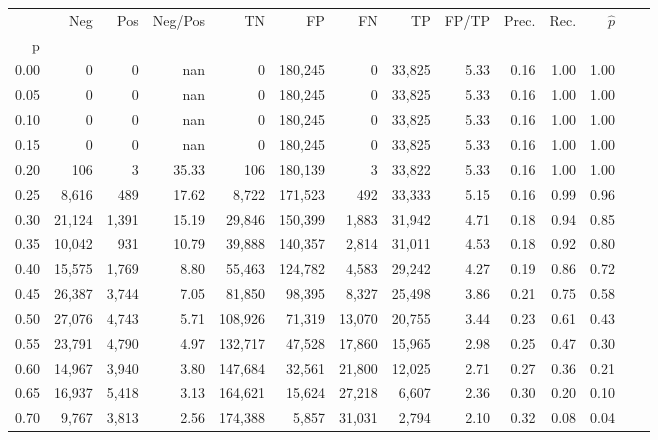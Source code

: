\begin{tabular}{rrrrrrrrrrrrrr}
\toprule
{} &     Neg &    Pos & Neg/Pos &       TN &       FP &      FN &      TP & FP/TP & Prec. &  Rec. & $\hat{p}$ \\
p    &         &        &         &          &          &         &         &       &       &       &           \\
\midrule
0.00 &       0 &      0 &     nan &        0 &  180,245 &       0 &  33,825 &  5.33 &  0.16 &  1.00 &      1.00 \\
0.05 &       0 &      0 &     nan &        0 &  180,245 &       0 &  33,825 &  5.33 &  0.16 &  1.00 &      1.00 \\
0.10 &       0 &      0 &     nan &        0 &  180,245 &       0 &  33,825 &  5.33 &  0.16 &  1.00 &      1.00 \\
0.15 &       0 &      0 &     nan &        0 &  180,245 &       0 &  33,825 &  5.33 &  0.16 &  1.00 &      1.00 \\
0.20 &     106 &      3 &   35.33 &      106 &  180,139 &       3 &  33,822 &  5.33 &  0.16 &  1.00 &      1.00 \\
0.25 &   8,616 &    489 &   17.62 &    8,722 &  171,523 &     492 &  33,333 &  5.15 &  0.16 &  0.99 &      0.96 \\
0.30 &  21,124 &  1,391 &   15.19 &   29,846 &  150,399 &   1,883 &  31,942 &  4.71 &  0.18 &  0.94 &      0.85 \\
0.35 &  10,042 &    931 &   10.79 &   39,888 &  140,357 &   2,814 &  31,011 &  4.53 &  0.18 &  0.92 &      0.80 \\
0.40 &  15,575 &  1,769 &    8.80 &   55,463 &  124,782 &   4,583 &  29,242 &  4.27 &  0.19 &  0.86 &      0.72 \\
0.45 &  26,387 &  3,744 &    7.05 &   81,850 &   98,395 &   8,327 &  25,498 &  3.86 &  0.21 &  0.75 &      0.58 \\
0.50 &  27,076 &  4,743 &    5.71 &  108,926 &   71,319 &  13,070 &  20,755 &  3.44 &  0.23 &  0.61 &      0.43 \\
0.55 &  23,791 &  4,790 &    4.97 &  132,717 &   47,528 &  17,860 &  15,965 &  2.98 &  0.25 &  0.47 &      0.30 \\
0.60 &  14,967 &  3,940 &    3.80 &  147,684 &   32,561 &  21,800 &  12,025 &  2.71 &  0.27 &  0.36 &      0.21 \\
0.65 &  16,937 &  5,418 &    3.13 &  164,621 &   15,624 &  27,218 &   6,607 &  2.36 &  0.30 &  0.20 &      0.10 \\
0.70 &   9,767 &  3,813 &    2.56 &  174,388 &    5,857 &  31,031 &   2,794 &  2.10 &  0.32 &  0.08 &      0.04 \\

\end{tabular}
